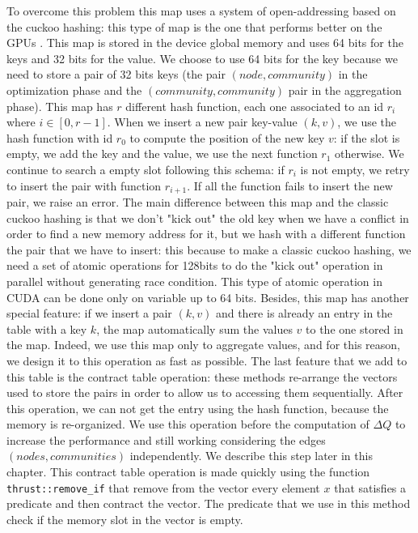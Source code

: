 To overcome this problem this map uses a system of open-addressing based on the cuckoo hashing: this type of map is the one that performs better on the GPUs \cite{alcantara2012building}. This map is stored in the device global memory and uses 64 bits for the keys and 32 bits for the value. We choose to use 64 bits for the key because we need to store a pair of 32 bits keys (the pair $(node, community)$ in the optimization phase and the $(community, community)$ pair in the aggregation phase). This map has $r$ different hash function, each one associated to an id $r_i$ where $i \in [0, r-1]$. When we insert a new pair key-value $(k,v)$, we use the hash function with id $r_0$ to compute the position of the new key $v$: if the slot is empty, we add the key and the value, we use the next function $r_1$ otherwise. We continue to search a empty slot following this schema: if $r_i$ is not empty, we retry to insert the pair with function $r_{i+1}$. If all the function fails to insert the new pair, we raise an error. The main difference between this map and the classic cuckoo hashing is that we don't "kick out" the old key when we have a conflict in order to find a new memory address for it, but we hash with a different function the pair that we have to insert: this because to make a classic cuckoo hashing, we need a set of atomic operations for 128bits to do the "kick out" operation in parallel without generating race condition. This type of atomic operation in CUDA can be done only on variable up to 64 bits. Besides, this map has another special feature: if we insert a pair $(k,v)$ and there is already an entry in the table with a key $k$, the map automatically sum the values $v$ to the one stored in the map. Indeed, we use this map only to aggregate values, and for this reason, we design it to this operation as fast as possible. The last feature that we add to this table is the contract table operation: these methods re-arrange the vectors used to store the pairs in order to allow us to accessing them sequentially. After this operation, we can not get the entry using the hash function, because the memory is re-organized. We use this operation before the computation of $\Delta Q$ to increase the performance and still working considering the edges $(nodes, communities)$ independently. We describe this step later in this chapter. This contract table operation is made quickly using the function \verb|thrust::remove_if| that remove from the vector every element $x$ that satisfies a predicate and then contract the vector. The predicate that we use in this method check if the memory slot in the vector is empty. \\
